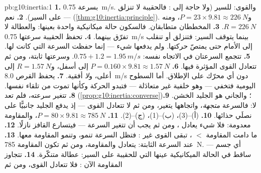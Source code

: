 \begin{solution}{pb:g10:inertia:1}
\textbf{1.}  بسرعة \qty{0.75}{m/s}. والقوى: 
 للسير (ولا حاجة إلى : فالحقيبة
لا تنزلق على السير).
\textbf{2.} نعم --- 
(\cref{thm:g10:inertia:principle}). و$P = 23 \times 9.81 \approx
\qty{226}{N}$، ومنه $R = \qty{226}{N}$.
\textbf{3.} المخططان متطابقان. فالسكون  حالة ميكانيكية واحدة بعينها: والعطالة لا
تفرّق بينهما.
\textbf{4.} تحفظ الحقيبة سرعتها \qty{0.75}{m/s} بينما يتوقف السير:
فتنزلق أو تنقلب إلى الأمام حتى يمتصّ  حركتها.
ولم يدفعها شيء --- إنما حفظت السرعة التي كانت لها.
\textbf{5.} تتجمع السرعتان في الاتجاه نفسه: $0.75 + 1.2 =
\qty{1.95}{m/s}$. وسرعتها ثابتة، ومن ثم تتعادل القوى المؤثرة فيها.
\textbf{6.} $P = 0.160 \times 9.81 \approx \qty{1.57}{N}$ إلى أسفل،
و$R = \qty{1.57}{N}$ إلى أعلى، و\emph{لا}  أفقية.
\textbf{7.} يحفظ القرص \qty{8.0}{m/s} دون أي محرّك على الإطلاق.
أما السطوح اليومية فتخفي  --- وهو  خلفية غير متعادَلة ---
فتبدو الحركة وكأنها تموت من تلقاء نفسها.
\textbf{8.} تتغير سرعته، فلم تعد 
(\cref{prop:g10:inertia:converse})؛ والجاني هو 
الجليد الخشن.
\textbf{9.} لا: فالسرعة \emph{متجهة}، واتجاهها
يتغير، ومن ثم لا تتعادل القوى --- إذ يدفع الجليد جانبيًّا
على نصلَي حذائها.
\textbf{10.} (أ)--(3)، (ب)--(1)، (ج)--(2).
\textbf{11.}  $P = 80 \times 9.81 \approx \qty{785}{N}$، والمقاومة
معدومة: فلا شيء يعادل ، ومن ثم يجب أن تتغير السرعة ---
فيتسارع القافز نازلًا.
\textbf{12.} ما دامت المقاومة $<$ ، تبقى القوى غير :
فتظل السرعة تنمو، وتنمو المقاومة معها.
\textbf{13.} عند السرعة الثابتة: يتعادل  والمقاومة، ومن ثم تكون المقاومة
\qty{785}{N}.  --- أي جسم ساقط في
الحالة الميكانيكية عينها التي للحقيبة على السير: عطالة
متنكّرة.
\textbf{14.} تتجاوز المقاومة الآن : فلا تتعادل القوى، ومن ثم

\end{solution}
